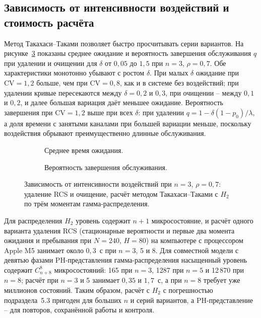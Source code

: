 \subsection{Зависимость от интенсивности воздействий и стоимость расчёта}\label{sec:delta}
Метод Такахаси--Таками позволяет быстро просчитывать серии вариантов. На рисунке~\ref{fig:delta} показаны среднее ожидание и вероятность завершения обслуживания \(q\) при удалении и очищении для \(\delta\) от \(0{,}05\) до \(1{,}5\) при \(n=3\), \(\rho=0{,}7\). Обе характеристики монотонно убывают с ростом \(\delta\). При малых \(\delta\) ожидание при \(\mathrm{CV}=1{,}2\) больше, чем при \(\mathrm{CV}=0{,}8\), как и в системе без воздействий; при удалении кривые пересекаются между \(\delta=0{,}2\) и \(0{,}3\), при очищении -- между \(0{,}1\) и \(0{,}2\), и далее большая вариация даёт меньшее ожидание. Вероятность завершения при \(\mathrm{CV}=1{,}2\) выше при всех \(\delta\): при удалении \(q=1-\delta(1-p_0)/\lambda\), а доля времени с занятыми каналами при большей вариации меньше, поскольку воздействия обрывают преимущественно длинные обслуживания.

\begin{figure}[!htbp]
\centering
\begin{subfigure}[t]{0.49\linewidth}
\centering
{}
\caption{Среднее время ожидания.}
\label{fig:delta_waiting}
\end{subfigure}
\begin{subfigure}[t]{0.49\linewidth}
\centering
{}
\caption{Вероятность завершения обслуживания.}
\label{fig:delta_q}
\end{subfigure}
\caption{Зависимость от интенсивности воздействий при \(n=3\), \(\rho=0{,}7\): удаление RCS и очищение, расчёт методом Такахаси--Таками с \(H_2\) по трём моментам гамма-распределения.}
\label{fig:delta}
\end{figure}

Для распределения \(H_2\) уровень содержит \(n+1\) микросостояние, и расчёт одного варианта удаления RCS (стационарные вероятности и первые два момента ожидания и пребывания при \(N=240\), \(H=80\)) на компьютере с процессором Apple M5 занимает около \(0{,}3\)~с при \(n=3\), 5 и 8. Для совместной модели с девятью фазами PH-представления гамма-распределения насыщенный уровень содержит \(C_{n+8}^{8}\) микросостояний: 165 при \(n=3\), 1287 при \(n=5\) и 12\,870 при \(n=8\); расчёт при \(n=3\) и 5 занимает \(0{,}35\) и \(1{,}7\)~с, а при \(n=8\) требует уже миллионов состояний. Таким образом, расчёт с \(H_2\) с погрешностью подраздела~5.3 пригоден для больших \(n\) и серий вариантов, а PH-представление -- для повторов, сохранённой работы и контроля.

